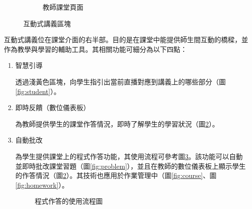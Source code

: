 \begin{figure}[H]
\begin{subfigure}{0.5\linewidth}
    \caption{教師課堂頁面}
    \label{fig:teacher}
  \end{subfigure}
  \caption{互動式講義區塊}
\end{figure}

互動式講義位在課堂介面的右半部。目的是在課堂中能提供師生間互動的橋樑，並作為教學與學習的輔助工具。其相關功能可細分為以下四點：

\begin{enumerate}
  \setlength{\parindent}{2em}

  \item 智慧引導
  \par 透過淺黃色區塊，向學生指引出當前直播對應到講義上的哪些部分（圖\ref{fig:student}）。
  
  \item 即時反饋（數位儀表板）
  \par 為教師提供學生的課堂作答情況，即時了解學生的學習狀況（圖\ref{fig:teacher}）。

  \item 自動批改
  \par 為學生提供課堂上的程式作答功能，其使用流程可參考圖\ref{fig:problem-flowchart}。該功能可以自動並即時批改課堂習題（圖\ref{fig:problem}），並且在教師的數位儀表板上顯示學生的作答情況（圖\ref{fig:teacher}）。其技術也應用於作業管理中（圖\ref{fig:course}、圖\ref{fig:homework}）。
  
  \begin{figure}[H]
    \centering
    \caption{程式作答的使用流程圖}
    \label{fig:problem-flowchart}
  \end{figure}


\end{enumerate}
